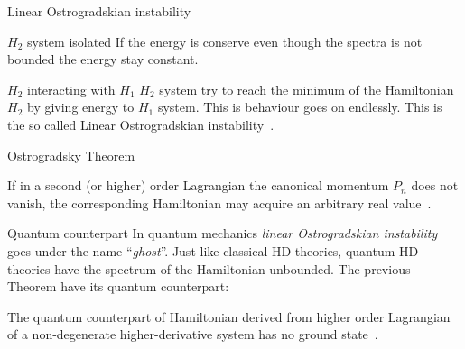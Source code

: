 \documentclass[10pt]{beamer}
\begin{document}
  \begin{frame}{Linear Ostrogradskian instability}
    \begin{alertblock}{$H_2$ system isolated}
      \vspace{0.5em}
      If the energy is conserve even though the spectra is not bounded the
      energy stay constant.
    \end{alertblock}
    \vspace{2.0em}
    \begin{alertblock}{$H_2$ interacting with $H_1$}
      \vspace{0.5em}
      $H_2$ system try to reach the minimum of the Hamiltonian $H_2$ by giving
      energy to $H_1$ system. This is behaviour goes on endlessly. This is the
      so called \alert{Linear Ostrogradskian instability}~\cite{Kallosh08,
      Eliezer89}.
    \end{alertblock}
  \end{frame}

  \begin{frame}{Ostrogradsky Theorem}
    \begin{theorem}[Ostrogradsky] \vspace{0.5em}
      If in a second (or higher) order Lagrangian the canonical momentum $P_n$
      does not vanish, the corresponding Hamiltonian may acquire an arbitrary
      real value~\cite{Smilga17}.
    \end{theorem}
  \end{frame}

  \begin{frame}{Quantum counterpart}
    In quantum mechanics \emph{linear Ostrogradskian instability} goes under the
    name ``\emph{ghost}''. Just like classical HD theories, quantum HD theories
    have the spectrum of the Hamiltonian unbounded. The previous Theorem have
    its quantum counterpart:
    \vspace{2.0em}
    \begin{theorem} \vspace{0.5em}
      The quantum counterpart of Hamiltonian derived from higher order
      Lagrangian of a non-degenerate higher-derivative system has no ground
      state~\cite{Smilga17}.
    \end{theorem}
  \end{frame}
\end{document}
